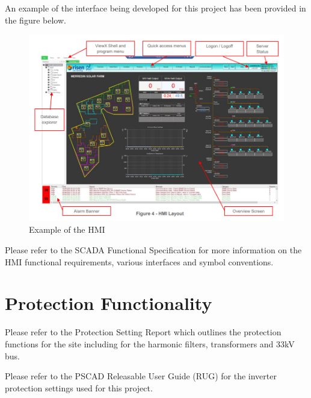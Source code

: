 \documentclass{../grid-link-report}
\newcommand{\projectassetsdir}{../project-assets}
\begin{document}
	An example of the interface being developed for this project has been provided in the figure below.
	
	\begin{figure}[H]
		\centering
		\includegraphics[width=1.0\linewidth]{report-assets/SCADA-HMI.png}
		\caption{Example of the HMI}
		\label{fig:scada-hmi}
	\end{figure}
	
	Please refer to the SCADA Functional Specification \cite{scada-spec} for more information on the HMI functional requirements, various interfaces and symbol conventions.


	\chapter{Protection Functionality}
	Please refer to the Protection Setting Report \cite{protection-settings-report} which outlines the protection functions for the site including for the harmonic filters, transformers and 33kV bus.
	
	Please refer to the PSCAD Releasable User Guide (RUG) for the inverter protection settings used for this project.
	

	
	
	\clearpage
	
	\makebackpage
	
	
	
	
	
	
	
\end{document}
